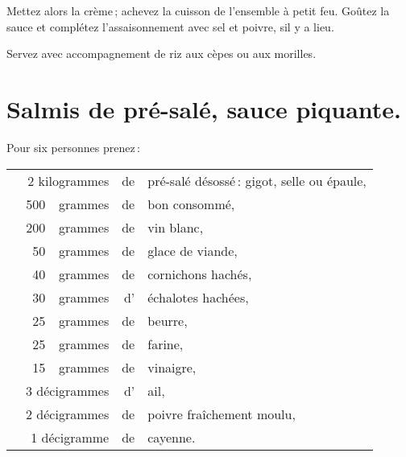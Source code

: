 Mettez alors la crème ; achevez la cuisson de l'ensemble à petit feu. Goûtez la
sauce et complétez l’assaisonnement avec sel et poivre, sil y a lieu.

Servez avec accompagnement de riz aux cèpes ou aux morilles.

\section*{\centering Salmis de pré-salé, sauce piquante.}
{}

Pour six personnes prenez :

\medskip

\footnotesize
\begin{longtable}{rrrrp{16em}}
  & \multicolumn{2}{r}{2 kilogrammes} & de & pré-salé désossé : gigot, selle ou épaule,                   \\
  & 500 & grammes & de & bon consommé,                                                                    \\
  & 200 & grammes & de & vin blanc,                                                                       \\
  &  50 & grammes & de & glace de viande,                                                                 \\
  &  40 & grammes & de & cornichons hachés,                                                               \\
  &  30 & grammes & d’ & échalotes hachées,                                                               \\
  &  25 & grammes & de & beurre,                                                                          \\
  &  25 & grammes & de & farine,                                                                          \\
  &  15 & grammes & de & vinaigre,                                                                        \\
  & \multicolumn{2}{r}{3 décigrammes} & d' & ail,                                                         \\
  & \multicolumn{2}{r}{2 décigrammes} & de & poivre fraîchement moulu,                                    \\
  & \multicolumn{2}{r}{1 décigramme } & de & cayenne.                                                     \\
\end{longtable}
\normalsize

